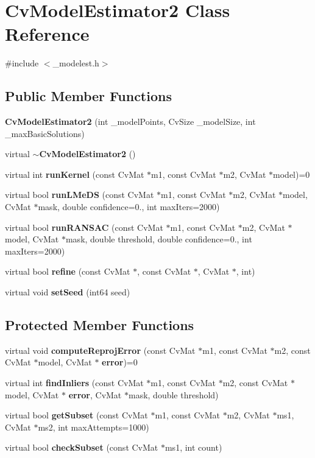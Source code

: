 \section{Cv\+Model\+Estimator2 Class Reference}
\label{class_cv_model_estimator2}


{\ttfamily \#include $<$\+\_\+modelest.\+h$>$}

\subsection*{Public Member Functions}
\begin{DoxyCompactItemize}
\item 
\textbf{ Cv\+Model\+Estimator2} (int \+\_\+model\+Points, Cv\+Size \+\_\+model\+Size, int \+\_\+max\+Basic\+Solutions)
\item 
virtual \textbf{ $\sim$\+Cv\+Model\+Estimator2} ()
\item 
virtual int \textbf{ run\+Kernel} (const Cv\+Mat $\ast$m1, const Cv\+Mat $\ast$m2, Cv\+Mat $\ast$model)=0
\item 
virtual bool \textbf{ run\+L\+Me\+DS} (const Cv\+Mat $\ast$m1, const Cv\+Mat $\ast$m2, Cv\+Mat $\ast$model, Cv\+Mat $\ast$mask, double confidence=0., int max\+Iters=2000)
\item 
virtual bool \textbf{ run\+R\+A\+N\+S\+AC} (const Cv\+Mat $\ast$m1, const Cv\+Mat $\ast$m2, Cv\+Mat $\ast$model, Cv\+Mat $\ast$mask, double threshold, double confidence=0., int max\+Iters=2000)
\item 
virtual bool \textbf{ refine} (const Cv\+Mat $\ast$, const Cv\+Mat $\ast$, Cv\+Mat $\ast$, int)
\item 
virtual void \textbf{ set\+Seed} (int64 seed)
\end{DoxyCompactItemize}
\subsection*{Protected Member Functions}
\begin{DoxyCompactItemize}
\item 
virtual void \textbf{ compute\+Reproj\+Error} (const Cv\+Mat $\ast$m1, const Cv\+Mat $\ast$m2, const Cv\+Mat $\ast$model, Cv\+Mat $\ast$\textbf{ error})=0
\item 
virtual int \textbf{ find\+Inliers} (const Cv\+Mat $\ast$m1, const Cv\+Mat $\ast$m2, const Cv\+Mat $\ast$model, Cv\+Mat $\ast$\textbf{ error}, Cv\+Mat $\ast$mask, double threshold)
\item 
virtual bool \textbf{ get\+Subset} (const Cv\+Mat $\ast$m1, const Cv\+Mat $\ast$m2, Cv\+Mat $\ast$ms1, Cv\+Mat $\ast$ms2, int max\+Attempts=1000)
\item 
virtual bool \textbf{ check\+Subset} (const Cv\+Mat $\ast$ms1, int count)
\end{DoxyCompactItemize}

